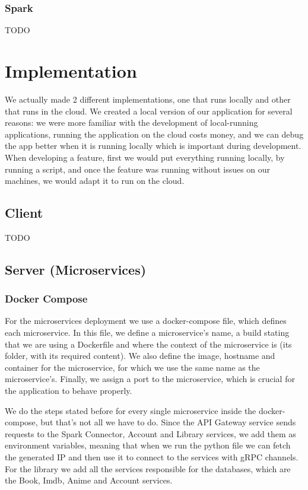 \documentclass[oneside]{article}
\newcommand*\fpar{\hspace{1ex}}
\begin{document}
    \subsubsection{Spark}
    \fpar TODO

\section{Implementation}
\label{sec:implementation}
\fpar We actually made 2 different implementations, one that runs locally and other that runs in the cloud. We created a local version of our application for several reasons: we were more familiar with the development of local-running applications, running the application on the cloud costs money, and we can debug the app better when it is running locally which is important during development. When developing a feature, first we would put everything running locally, by running a script, and once the feature was running without issues on our machines, we would adapt it to run on the cloud.

    \subsection{Client}
    \fpar TODO

    \subsection{Server (Microservices)}
      \subsubsection{Docker Compose}
      \fpar For the microservices deployment we use a docker-compose file, which defines each microservice. In this file, we define a microservice's name, a build stating that we are using a Dockerfile and where the context of the microservice is (its folder, with its required content). We also define the image, hostname and container for the microservice, for which we use the same name as the microservice's. Finally, we assign a port to the microservice, which is crucial for the application to behave properly.
      \par We do the steps stated before for every single microservice inside the docker-compose, but that's not all we have to do. Since the API Gateway service sends requests to the Spark Connector, Account and Library services, we add them as environment variables, meaning that when we run the python file we can fetch the generated IP and then use it to connect to the services with gRPC channels. For the library we add all the services responsible for the databases, which are the Book, Imdb, Anime and Account services.
\end{document}
